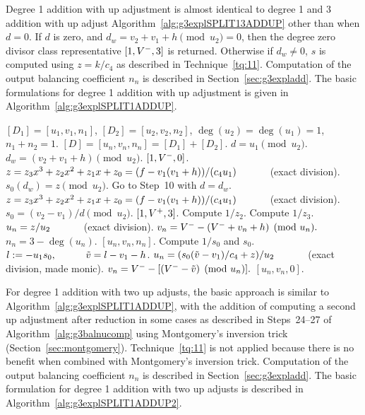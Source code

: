 Degree 1 addition with up adjustment is almost identical to degree 1 and 3
addition with up adjust Algorithm~\ref{alg:g3explSPLIT13ADDUP} other than when
$d = 0$. If $d$  is zero, and $d_w = v_2 + v_1 + h \pmod{u_2} = 0$, then the
degree zero divisor class representative $[1,V^{-},3]$ is returned. Otherwise if
$d_w \neq 0$, $s$ is computed using $z = k/c_4$ as described in
Technique~\ref{tq:11}. Computation of the output balancing coefficient $n_n$ is
described in Section~\ref{sec:g3expladd}. The basic formulations for degree 1
addition with up adjustment is given in Algorithm~\ref{alg:g3explSPLIT1ADDUP}.

\begin{algorithm}[H]
\caption{Genus 3 Split Model Degree 1 Addition with Up Adjust\label{alg:g3explSPLIT1ADDUP}}
\begin{algorithmic} [1]
\Require $[D_1] = [u_1,v_1,n_1]$, $[D_2] = [u_2,v_2,n_2]$, $\deg(u_2) = \deg(u_1) = 1$, $n_1 + n_2 = 1$.
\Ensure $[D] = [u_n,v_n,n_n] = [D_1] + [D_2] $.
\algrule
\vspace{-2pt}
\State $d = u_1 \pmod{u_2}$.
    \State $d_w = (v_2 + v_1 + h) \pmod{u_2}$.
     \hspace{3pt} \Return $[1,V^{-}, 0]$.
    \EndIf
    \State $z = z_3x^3 + z_2x^2 + z_1x + z_0 = (f - v_1(v_1 + h))/(c_4u_1) \quad\quad\quad$ (exact division).  
    \State $s_0(d_w) = z \pmod{u_2}$.
    \State Go to Step~10 with $d = d_w$.
\EndIf
\State $z = z_3x^3 + z_2x^2 + z_1x + z_0 = (f - v_1(v_1 + h))/(c_4u_1) \quad\quad\quad$ (exact division).  
\State $s_0 = (v_2 - v_1)/d \pmod{u_2}$.
         \Return $[1,V^{+},3]$.
        \Else \hspace{3pt} Compute $1/z_2$.
        \EndIf
    \Else \hspace{3pt} Compute $1/z_3$.
    \EndIf
    \State $u_n = z/u_2 \quad\quad\quad$ (exact division).
    \State $v_n = V^{-} - (V^{-} + v_n + h) \pmod{u_n}.$
    \State $n_n = 3 - \deg(u_n)$.
    \State \Return $[u_n,v_n,n_n]$.
\EndIf
\State Compute $1/s_0$ and $s_0$.
\State $l := -u_1s_0, \quad\quad\quad \tilde{v} = l - v_1 - h$.
\State $u_n = (s_0(\tilde{v} - v_1)/c_4 + z)/u_2 \quad\quad\quad$ (exact division, made monic).
\State $v_n = V^{-} - [(V^{-} - \tilde{v}) \pmod{u_n}].$ 
\State \Return $[u_n,v_n,0]$.
\vspace{-2pt}
\end{algorithmic}
\end{algorithm}

For degree 1 addition with two up adjusts, the basic approach is similar to
Algorithm~\ref{alg:g3explSPLIT1ADDUP}, with the addition of computing a second
up adjustment after reduction in some cases as described in Steps~24--27 of
Algorithm~\ref{alg:g3balnucomp} using Montgomery's inversion trick
(Section~\ref{sec:montgomery}). Technique~\ref{tq:11} is not applied because
there is no benefit when combined with Montgomery's inversion trick. Computation
of the output balancing coefficient $n_n$ is described in
Section~\ref{sec:g3expladd}. The basic formulation for degree 1 addition with two
up adjusts is described in Algorithm~\ref{alg:g3explSPLIT1ADDUP2}.

